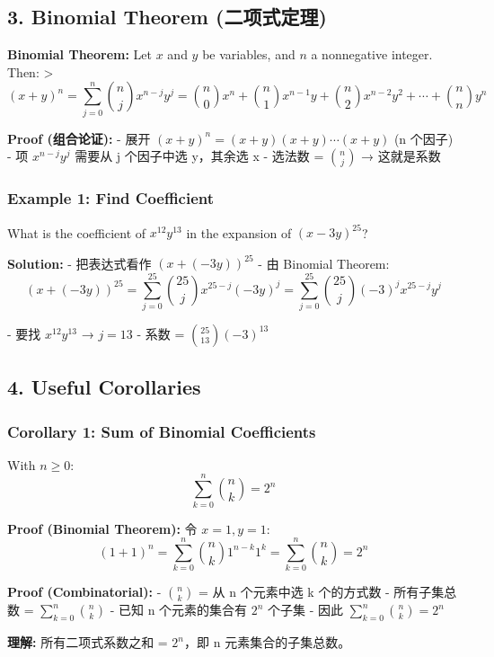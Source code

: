 \documentclass[10pt,a4paper,openany]{ctexbook}
\theoremstyle{definition}
\theoremstyle{remark}
\renewenvironment{quote}
  {\list{}{\leftmargin=1em\rightmargin=0pt\topsep=0.5pt\partopsep=0pt}\item[]}
  {\endlist}
\begin{document}
\subsection{3. Binomial Theorem (二项式定理)}

\begin{quote}
\textbf{Binomial Theorem:} Let $x$ and $y$ be variables, and $n$ a nonnegative integer. Then:
>
\[
(x+y)^n = \sum_{j=0}^{n} \binom{n}{j} x^{n-j} y^j = \binom{n}{0}x^n + \binom{n}{1}x^{n-1}y + \binom{n}{2}x^{n-2}y^2 + \cdots + \binom{n}{n}y^n
\]


\textbf{Proof (组合论证):}
- 展开 $(x+y)^n = (x+y)(x+y)\cdots(x+y)$ (n 个因子)
- 项 $x^{n-j}y^j$ 需要从 j 个因子中选 y，其余选 x
- 选法数 = $\binom{n}{j}$ → 这就是系数

\end{quote}

\subsubsection{Example 1: Find Coefficient}

\begin{quote}
What is the coefficient of $x^{12}y^{13}$ in the expansion of $(x - 3y)^{25}$?

\textbf{Solution:}
- 把表达式看作 $(x + (-3y))^{25}$
- 由 Binomial Theorem:
\[
(x + (-3y))^{25} = \sum_{j=0}^{25} \binom{25}{j} x^{25-j} (-3y)^j = \sum_{j=0}^{25} \binom{25}{j} (-3)^j x^{25-j} y^j
\]

- 要找 $x^{12}y^{13}$ → $j = 13$
- 系数 = $\binom{25}{13} (-3)^{13}$

\end{quote}
\vspace{-2pt}

\subsection{4. Useful Corollaries}

\subsubsection{Corollary 1: Sum of Binomial Coefficients}

\begin{quote}
With $n \ge 0$:
\[
\sum_{k=0}^{n} \binom{n}{k} = 2^n
\]


\textbf{Proof (Binomial Theorem):} 令 $x = 1, y = 1$:
\[
(1+1)^n = \sum_{k=0}^{n} \binom{n}{k} 1^{n-k} 1^k = \sum_{k=0}^{n} \binom{n}{k} = 2^n
\]


\textbf{Proof (Combinatorial):}
- $\binom{n}{k}$ = 从 n 个元素中选 k 个的方式数
- 所有子集总数 = $\sum_{k=0}^{n} \binom{n}{k}$
- 已知 n 个元素的集合有 $2^n$ 个子集
- 因此 $\sum_{k=0}^{n} \binom{n}{k} = 2^n$

\textbf{理解:} 所有二项式系数之和 = $2^n$，即 n 元素集合的子集总数。

\end{quote}
\end{document}
